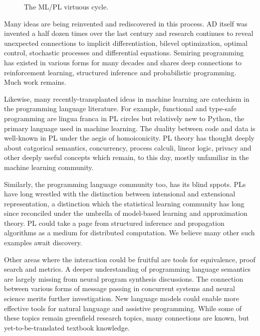 \documentclass{article}
\begin{document}
    \begin{figure}[H]
        \centering
        \caption{The ML/PL virtuous cycle.}
    \end{figure}

    Many ideas are being reinvented and rediscovered in this process. AD itself was invented a half dozen times over the last century and research continues to reveal unexpected connections to implicit differentiation, bilevel optimization, optimal control, stochastic processes and differential equations. Semiring programming has existed in various forms for many decades and shares deep connections to reinforcement learning, structured inference and probabilistic programming. Much work remains.

    Likewise, many recently-transplanted ideas in machine learning are catechism in the programming language literature. For example, functional and type-safe programming are lingua franca in PL circles but relatively new to Python, the primary language used in machine learning. The duality between code and data is well-known in PL under the aegis of homoiconicity. PL theory has thought deeply about catgorical semantics, concurrency, process calculi, linear logic, privacy and other deeply useful concepts which remain, to this day, mostly unfamiliar in the machine learning community.

    Similarly, the programming language community too, has its blind sppots. PLs have long wrestled with the distinction between intensional and extensional representation, a distinction which the statistical learning community has long since reconciled under the umbrella of model-based learning and approximation theory. PL could take a page from structured inference and propagation algorithms as a medium for distributed computation. We believe many other such examples await discovery.

    Other areas where the interaction could be fruitful are tools for equivalence, proof search and metrics. A deeper understanding of programming language semantics are largely missing from neural program synthesis discussions. The connection between various forms of message passing in concurrent systems and neural science merits further investigation. New language models could enable more effective tools for natural language and assistive programming. While some of these topics remain greenfield research topics, many connections are known, but yet-to-be-translated textbook knowledge.
\end{document}
